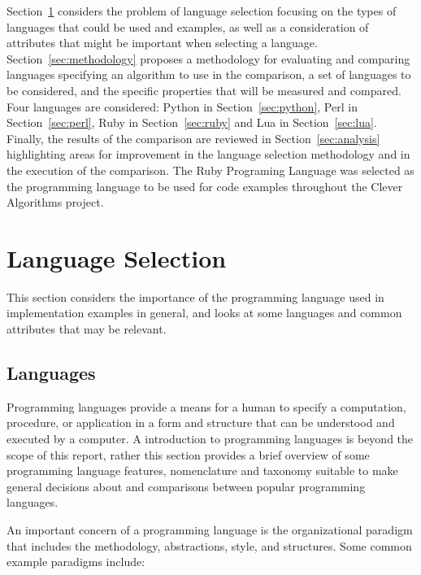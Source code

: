 \documentclass[a4paper, 11pt]{article}
\begin{document}
Section~\ref{sec:language_selection} considers the problem of language selection focusing on the types of languages that could be used and examples, as well as a consideration of attributes that might be important when selecting a language.
Section~\ref{sec:methodology} proposes a methodology for evaluating and comparing languages specifying an algorithm to use in the comparison, a set of languages to be considered, and the specific properties that will be measured and compared.
Four languages are considered: Python in Section~\ref{sec:python}, Perl in Section~\ref{sec:perl}, Ruby in Section~\ref{sec:ruby} and Lua in Section~\ref{sec:lua}.
Finally, the results of the comparison are reviewed in Section~\ref{sec:analysis} highlighting areas for improvement in the language selection methodology and in the execution of the comparison. The Ruby Programing Language was selected as the programming language to be used for code examples throughout the Clever Algorithms project.

% 
% 
\section{Language Selection}
\label{sec:language_selection}
This section considers the importance of the programming language used in implementation examples in general, and looks at some languages and common attributes that may be relevant.

% 
%
\subsection{Languages}
Programming languages provide a means for a human to specify a computation, procedure, or application in a form and structure that can be understood and executed by a computer.
A introduction to programming languages is beyond the scope of this report, rather this section provides a brief overview of some programming language features, nomenclature and taxonomy suitable to make general decisions about and comparisons between popular programming languages.

An important concern of a programming language is the organizational paradigm that includes the methodology, abstractions, style, and structures. Some common example paradigms include:
\end{document}
